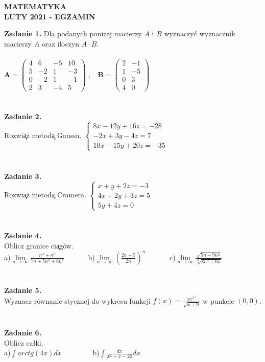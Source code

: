 \documentclass{report}
\begin{document}
\begin{center}
\textbf{MATEMATYKA \\LUTY 2021 - EGZAMIN}
\end{center}
\textbf{Zadanie 1.} 
Dla podanych poniżej macierzy $A$ i $B$ wyznaczyć wyznacznik macierzy $A$ oraz iloczyn $A\cdot B$.
\\\\
$
\mathbf{A} =
\left( \begin{array}{cccc}
4 & 6& -5 & 10\\
5 & -2& 1 & -3\\
0 & -2& 1 & -1\\
2 & 3 & -4 & 5 
\end{array} \right)
$ ,\ \ 
$
\mathbf{B} =
\left( \begin{array}{cccc}
2 & -1\\
1 & -5\\
0 & 3\\
4 & 0  
\end{array} \right)
$
\\\\\\\textbf{Zadanie 2.} 
\\Rozwi\c{a}\.z metod\c{a} Gaussa. 
$
\left\{ \begin{array}{ll}
8x-12y+16z=-28\\
-2x+3y-4z=7\\
10x-15y+20z=-35
\end{array} \right.
$
\\\\\\\textbf{Zadanie 3.} 
\\Rozwi\c{a}\.z metod\c{a} Cramera. 
$
\left\{ \begin{array}{ll}
x+y+2z=-3\\
4x+2y+3z=5\\
5y+4z=0
\end{array} \right.
$
\\\\\\\textbf{Zadanie 4.}
\\Oblicz granice ci\c{a}g\'ow.
\\a)$\lim\limits_{n\to\infty}\frac{n^4+n^3}{7n+5n^3+8n^4}$
\ \ \ \ \ \  b)$\lim\limits_{n\to \infty}(\frac{2n+5}{2n})^n$
\ \ \ \ \ \ c)$\lim\limits_{n\to\infty} \frac{\sqrt{5n+9n^2}}{\sqrt[3]{8n^3+6n}}$
\\\\\\\textbf{Zadanie 5.}
\\Wyznacz równanie stycznej do wykresu funkcji $f(x)=\frac{xe^{x^2}}{\sqrt{x+9}}$ w punkcie $(0,0)$. 
\\\\\\\textbf{Zadanie 6.}
\\Oblicz całki. 
\\a)$\int arctg(4x) dx$ \ \ \ \ \ \ \ \ b)$\int \frac{dx}{x^2-x-20} dx$
\end{document}
